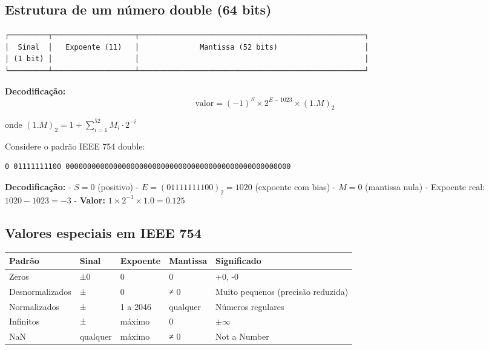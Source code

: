 \documentclass[
  11pt,
  letterpaper,
  DIV=11,
  numbers=noendperiod]{scrartcl}
\newcounter{none} %
\begin{document}
\subsection{Estrutura de um número double (64
bits)}\label{estrutura-de-um-nuxfamero-double-64-bits}

\begin{verbatim}
┌─────────┬───────────────────┬────────────────────────────────────────────────────┐
│  Sinal  │   Expoente (11)   │              Mantissa (52 bits)                    │
│ (1 bit) │                   │                                                    │
└─────────┴───────────────────┴────────────────────────────────────────────────────┘
\end{verbatim}

\textbf{Decodificação:}
\[\text{valor} = (-1)^S \times 2^{E - 1023} \times (1.M)_2\]

onde \((1.M)_2 = 1 + \sum_{i=1}^{52} M_i \cdot 2^{-i}\)

\begin{tcolorbox}[enhanced jigsaw, arc=.35mm, bottomrule=.15mm, bottomtitle=1mm, breakable, colback=white, colbacktitle=quarto-callout-tip-color!10!white, colframe=quarto-callout-tip-color-frame, coltitle=black, left=2mm, leftrule=.75mm, opacityback=0, opacitybacktitle=0.6, rightrule=.15mm, title=\textcolor{quarto-callout-tip-color}{\faLightbulb}\hspace{0.5em}{Exemplo de decodificação}, titlerule=0mm, toprule=.15mm, toptitle=1mm]

Considere o padrão IEEE 754 double:

\begin{verbatim}
0 01111111100 0000000000000000000000000000000000000000000000000000
\end{verbatim}

\textbf{Decodificação:} - \(S = 0\) (positivo) -
\(E = (01111111100)_2 = 1020\) (expoente com bias) - \(M = 0\) (mantissa
nula) - Expoente real: \(1020 - 1023 = -3\) - \textbf{Valor:}
\(1 \times 2^{-3} \times 1.0 = 0.125\)

\end{tcolorbox}

\subsection{Valores especiais em IEEE
754}\label{valores-especiais-em-ieee-754}

{\def\LTcaptype{none} %
\begin{longtable}[]{@{}lllll@{}}
\toprule\noalign{}
Padrão & Sinal & Expoente & Mantissa & Significado \\
\midrule\noalign{}
\endhead
\bottomrule\noalign{}
\endlastfoot
Zeros & ±0 & 0 & 0 & +0, -0 \\
Desnormalizados & ± & 0 & ≠ 0 & Muito pequenos (precisão reduzida) \\
Normalizados & ± & 1 a 2046 & qualquer & Números regulares \\
Infinitos & ± & máximo & 0 & \(\pm \infty\) \\
NaN & qualquer & máximo & ≠ 0 & Not a Number \\
\end{longtable}
}
\end{document}

